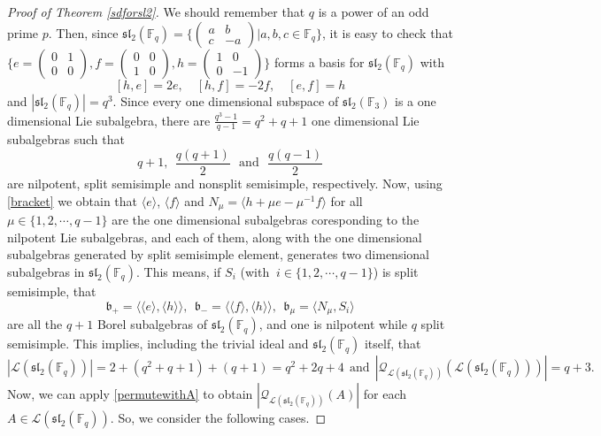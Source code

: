 \documentclass{amsart}
\theoremstyle{definition}
\numberwithin{equation}{section}
\begin{document}
\begin{proof}[Proof of Theorem \ref{sdforsl2}] 
We should remember that $q$ is a power of an odd prime $p$. Then, since 
 $\mathfrak{sl}_2(\mathbb{F}_q)=\Bigg \{ \begin{pmatrix}a&b \\ c&-a\end{pmatrix}\Big| a,b,c \in \mathbb{F}_q \Bigg \}$, it is easy to check that $ \Bigg \{e=\begin{pmatrix} 0 & 1 \\ 0 & 0 \end{pmatrix}, f=\begin{pmatrix} 0 & 0 \\ 1 & 0 \end{pmatrix}, h=\begin{pmatrix} 1 & 0 \\ 0 & -1 \end{pmatrix}\Bigg \}$ forms a basis for $\mathfrak{sl}_2(\mathbb{F}_q)$ with 
 \begin{equation} \label{bracket}
     [h, e] = 2e, \quad [h, f] = -2f , \quad [e, f] = h 
 \end{equation}
 and  $|\mathfrak{sl}_2(\mathbb{F}_q)|=q^3$.  Since every one dimensional subspace of $\mathfrak{sl}_2(\mathbb{F}_3)$ is a one dimensional Lie subalgebra, there are $\frac{q^3-1}{q-1}=q^2+q+1$ one dimensional Lie subalgebras such that
\begin{equation} \label{size of lines}
    q+1, \ \ \frac{q(q+1)}{2} \ \ \ \mbox{and}\ \ \ \frac{q(q-1)}{2}
\end{equation}
are  nilpotent, split semisimple  and  nonsplit semisimple,  respectively. Now,
using \eqref{bracket} we obtain that  $\langle e \rangle$, $\langle f \rangle$  and  $N_\mu=\langle h+\mu e -\mu^{-1}f\rangle$ for all $\mu \in\{1,2,\cdots, q-1\}$ are the one dimensional subalgebras coresponding to the nilpotent Lie subalgebras, and each  of them, along with the one dimensional subalgebras generated by split semisimple element, generates  two dimensional  subalgebras in $\mathfrak{sl}_2(\mathbb{F}_q)$. 
This means, if $S_i$ (with $ \ i \in\{1,2,\cdots, q-1\}$) is split semisimple, that
$$\mathfrak{b}_+=\langle \langle e \rangle, \langle h \rangle \rangle, \ \ \mathfrak{b}_-=\langle \langle f \rangle, \langle h \rangle \rangle, \ \
\mathfrak{b}_{\mu}= \langle N_\mu, S_i \rangle $$  are all the $q+1$ Borel subalgebras of $\mathfrak{sl}_2(\mathbb{F}_q)$, and one is nilpotent while $q$ split semisimple.  
This implies, including the trivial ideal and $\mathfrak{sl}_2(\mathbb{F}_q)$ itself, that
\begin{equation}\label{size of the lattice of sl2}
      |\mathcal{L}(\mathfrak{sl}_2(\mathbb{F}_q))|=2+(q^2+q+1)+(q+1)= q^2+2q+4 \ \ \mbox{and} \ \ |\mathcal{Q}_{\mathcal{L}(\mathfrak{sl}_2(\mathbb{F}_q))}(\mathcal{L}(\mathfrak{sl}_2(\mathbb{F}_q)))|= q+3.
\end{equation}
Now, we can apply \eqref{permutewithA} to obtain $|\mathcal{Q}_{\mathcal{L}(\mathfrak{sl}_2(\mathbb{F}_q))}(A)|$ for each $A \in \mathcal{L}(\mathfrak{sl}_2(\mathbb{F}_q))$.  So, we consider the following cases. 


\end{proof}
\end{document}
